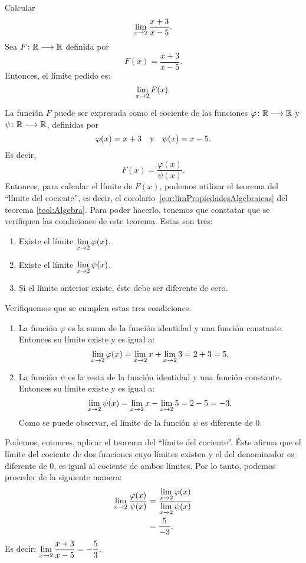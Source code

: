 \begin{exemplo}[Solución]{%
Calcular
\[
\limjc{\frac{x + 3}{x - 5}}{x}{2}.
\]
}%
Sea $\funcjc{F}{\mathbb{R}}{\mathbb{R}}$ definida por
\[
F(x) = \frac{x + 3}{x - 5}.
\]
Entonces, el límite pedido es:
\[
\limjc{F(x)}{x}{2}.
\]

La función $F$ puede ser expresada como el cociente de las funciones
$\funcjc{\varphi}{\mathbb{R}}{\mathbb{R}}$ y $\funcjc{\psi}{\mathbb{R}}{\mathbb{R}}$, definidas por
\[
\varphi(x) = x + 3 \yjc \psi(x) = x - 5.
\]
Es decir,
\[
F(x) = \frac{\varphi(x)}{\psi(x)}.
\]
Entonces, para calcular el límite de $F(x)$, podemos utilizar el teorema del ``límite del
cociente'', es decir, el corolario~\ref{cor:limPropiedadesAlgebraicas} del teorema
\ref{teol:Algebra}. Para poder hacerlo, tenemos que constatar que se verifiquen las condiciones de
este teorema. Estas son tres:
\begin{enumerate}
\item Existe el límite
$\displaystyle
\limjc{\varphi(x)}{x}{2}$.

\item Existe el límite
$\displaystyle
\limjc{\psi(x)}{x}{2}$.

\item Si el límite anterior existe, éste debe ser diferente de cero.
\end{enumerate}
Verifiquemos que se cumplen estas tres condiciones.
\begin{enumerate}
\item La función $\varphi$ es la suma de la función identidad y una función constante. Entonces
    su límite existe y es igual a:
   \[
    \limjc{\varphi(x)}{x}{2} = \limjc{x}{x}{2} + \limjc{3}{x}{2} = 2 + 3 = 5.
   \]
\item La función $\psi$ es la resta de la función identidad y una función constante. Entonces
    su límite existe y es igual a:
   \[
    \limjc{\psi(x)}{x}{2} = \limjc{x}{x}{2} - \limjc{5}{x}{2} = 2 - 5 = -3.
   \]
   Como se puede observar, el límite de la función $\psi$ es diferente de $0$.
\end{enumerate}

Podemos, entonces, aplicar el teorema del ``límite del cociente''. Éste afirma que el límite del
cociente de dos funciones cuyo límites existen y el del denominador es diferente de $0$, es igual
al cociente de ambos límites. Por lo tanto, podemos proceder de la siguiente manera:
\begin{align*}
\limjc{\frac{\varphi(x)}{\psi(x)}}{x}{2} &= \frac{\displaystyle\limjc{\varphi(x)}{x}{2}}{\displaystyle\limjc{\psi(x)}{x}{2}} \\
   &= \frac{5}{-3}.
\end{align*}
Es decir:
$\displaystyle
\limjc{\frac{x + 3}{x - 5}}{x}{2} = -\frac{5}{3}$.
\end{exemplo}

